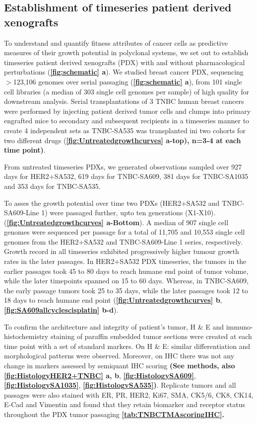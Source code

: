 \subsection{Establishment of timeseries patient derived xenografts}

To understand and quantify fitness attributes of cancer cells as  predictive measures of their growth potential in polyclonal systems, we set out to establish timeseries patient derived xenografts (PDX) with and without pharmacological perturbations (\textbf{\autoref{fig:schematic} a}). We studied breast cancer PDX, sequencing $>$123,106 genomes over serial passaging (\textbf{\autoref{fig:schematic} a}), from 101 single cell libraries (a median of 303 single cell genomes per sample) of high quality for downstream analysis. 
Serial transplantations of 3 TNBC human breast cancers were performed by injecting patient derived tumor cells and clumps into primary engrafted mice to secondary and subsequent recipients in a timeseries manner to create 4 independent sets as TNBC-SA535 was transplanted ini two cohorts for two different drugs (\textbf{\autoref{fig:Untreatedgrowthcurves} a-top), n=3-4 at each time point)}. 

From untreated timeseries PDXs, we generated observations sampled over 927 days for HER2+SA532, 619 days for TNBC-SA609, 381 days for TNBC-SA1035 and 353 days for TNBC-SA535. 

To asses the growth potential over time two PDXs (HER2+SA532 and TNBC-SA609-Line 1) were passaged further, upto ten generations (X1-X10).
 (\textbf{\autoref{fig:Untreatedgrowthcurves} a-Bottom}).
 A median of 907 single cell genomes were sequenced per passage for a total of 11,705 and 10,553 single cell genomes from the HER2+SA532 and TNBC-SA609-Line 1 series, respectively. 
Growth record in all timeseries exhibited progressively higher tumour growth rates in the later passages. In HER2+SA532 PDX timeseries, the tumors in the earlier passages took 45 to 80 days to reach humane end point of tumor volume, while the later timepoints spanned on 15 to 60 days. Whereas, in TNBC-SA609, the early passage tumors took 25 to 35 days, while the later passages took 12 to 18 days to reach humane end point (\textbf{\autoref{fig:Untreatedgrowthcurves} b}, \textbf{\autoref{fig:SA609allcyclescisplatin} b-d}).

To confirm the architecture and integrity of patient's tumor, H \& E and immuno-histochemistry staining of paraffin embedded tumor sections were created at each time point with a set of standard markers. On H \& E: similar differentiation and morphological patterns were observed. Moreover, on IHC there was not any change in markers assessed by semiquant IHC scoring \textbf{(See methods, also {\autoref{fig:HistologyHER2+TNBC}} a, b},  \textbf{\autoref{fig:HistologySA609}},  \textbf{\autoref{fig:HistologySA1035}}, \textbf{\autoref{fig:HistologySA535})}. 
Replicate tumors and all passages were also stained with ER, PR, HER2, Ki67, SMA, CK5/6, CK8, CK14, E-Cad and Vimentin and found that they retain biomarker and receptor status throughout the PDX tumor passaging \textbf{\autoref{tab:TNBCTMAscoringIHC}.}

